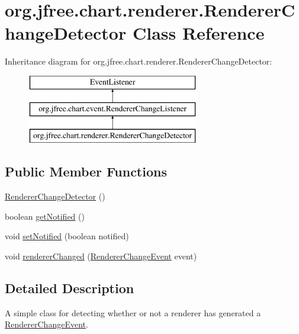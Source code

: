 \hypertarget{classorg_1_1jfree_1_1chart_1_1renderer_1_1_renderer_change_detector}{}\section{org.\+jfree.\+chart.\+renderer.\+Renderer\+Change\+Detector Class Reference}
\label{classorg_1_1jfree_1_1chart_1_1renderer_1_1_renderer_change_detector}
Inheritance diagram for org.\+jfree.\+chart.\+renderer.\+Renderer\+Change\+Detector\+:\begin{figure}[H]
\begin{center}
\leavevmode
\includegraphics[height=3.000000cm]{classorg_1_1jfree_1_1chart_1_1renderer_1_1_renderer_change_detector}
\end{center}
\end{figure}
\subsection*{Public Member Functions}
\begin{DoxyCompactItemize}
\item 
\mbox{\hyperlink{classorg_1_1jfree_1_1chart_1_1renderer_1_1_renderer_change_detector_aa0e14beabbe1a3a3582ac80084fbf764}{Renderer\+Change\+Detector}} ()
\item 
boolean \mbox{\hyperlink{classorg_1_1jfree_1_1chart_1_1renderer_1_1_renderer_change_detector_abbc283cf4c2aec179533d6f7832a78c2}{get\+Notified}} ()
\item 
void \mbox{\hyperlink{classorg_1_1jfree_1_1chart_1_1renderer_1_1_renderer_change_detector_af9c9403de2bc4f16c4f4ebc404f21e8d}{set\+Notified}} (boolean notified)
\item 
void \mbox{\hyperlink{classorg_1_1jfree_1_1chart_1_1renderer_1_1_renderer_change_detector_ab2812d7623a94fe91b0bc0ac708989df}{renderer\+Changed}} (\mbox{\hyperlink{classorg_1_1jfree_1_1chart_1_1event_1_1_renderer_change_event}{Renderer\+Change\+Event}} event)
\end{DoxyCompactItemize}


\subsection{Detailed Description}
A simple class for detecting whether or not a renderer has generated a \mbox{\hyperlink{}{Renderer\+Change\+Event}}. 

